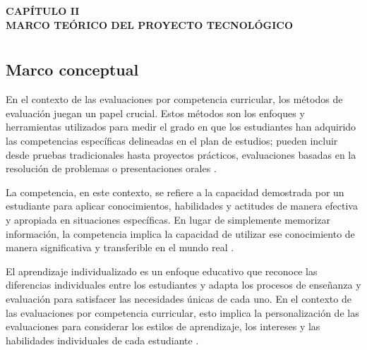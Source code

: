 
\cleardoublepage
\thispagestyle{empty}
\vspace*{\fill}
\begin{center}
{\Large\bfseries CAPÍTULO II}\\[2.5cm]
{\Large\bfseries MARCO TEÓRICO DEL PROYECTO TECNOLÓGICO}
\end{center}
\vspace*{\fill}
\clearpage

\chapter*{}
\setcounter{chapter}{2}
\setcounter{section}{0}
\renewcommand{\thesection}{2.\arabic{section}}
\renewcommand{\thesubsection}{2.\arabic{section}.\arabic{subsection}}

\vspace{-3cm}

\section{Marco conceptual}

En el contexto de las evaluaciones por competencia curricular, los métodos de evaluación juegan un papel crucial. Estos métodos son los enfoques y herramientas utilizados para medir el grado en que los estudiantes han adquirido las competencias específicas delineadas en el plan de estudios; pueden incluir desde pruebas tradicionales hasta proyectos prácticos, evaluaciones basadas en la resolución de problemas o presentaciones orales \cite{ref25_gulikers}.

La competencia, en este contexto, se refiere a la capacidad demostrada por un estudiante para aplicar conocimientos, habilidades y actitudes de manera efectiva y apropiada en situaciones específicas. En lugar de simplemente memorizar información, la competencia implica la capacidad de utilizar ese conocimiento de manera significativa y transferible en el mundo real \cite{ref25_gulikers}.

El aprendizaje individualizado es un enfoque educativo que reconoce las diferencias individuales entre los estudiantes y adapta los procesos de enseñanza y evaluación para satisfacer las necesidades únicas de cada uno. En el contexto de las evaluaciones por competencia curricular, esto implica la personalización de las evaluaciones para considerar los estilos de aprendizaje, los intereses y las habilidades individuales de cada estudiante \cite{ref26_tomlinson}.

